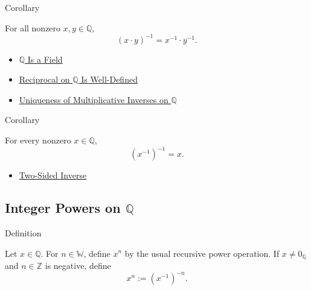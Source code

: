 \begin{corollarybox}{Corollary}
\begin{corollary}
\label{cor:inverse-of-product-on-q}
For all nonzero $x,y\in\mathbb{Q}$,
\[
(x\cdot y)^{-1}=x^{-1}\cdot y^{-1}.
\]
\end{corollary}
\end{corollarybox}

\begin{dependencies}
\begin{itemize}
  \item \hyperref[thm:q-is-a-field]{$\mathbb{Q}$ Is a Field}
  \item \hyperref[thm:reciprocal-on-q-well-defined]{Reciprocal on $\mathbb{Q}$ Is Well-Defined}
  \item \hyperref[cor:uniqueness-multiplicative-inverse-on-q]{Uniqueness of Multiplicative Inverses on $\mathbb{Q}$}
\end{itemize}
\end{dependencies}

\begin{corollarybox}{Corollary}
\begin{corollary}
\label{cor:inverse-of-inverse-on-q}
For every nonzero $x\in\mathbb{Q}$,
\[
(x^{-1})^{-1}=x.
\]
\end{corollary}
\end{corollarybox}

\begin{dependencies}
\begin{itemize}
  \item \hyperref[def:two-sided-inverse]{Two-Sided Inverse}
\end{itemize}
\end{dependencies}

\subsection*{\texorpdfstring{Integer Powers on $\mathbb{Q}$}{Integer Powers on Q}}

\begin{definitionbox}{Definition}
\begin{definition}
\label{def:integer-power-on-q}
Let $x\in\mathbb{Q}$. For $n\in\mathbb{W}$, define $x^n$ by the usual
recursive power operation. If $x\ne 0_{\mathbb{Q}}$ and $n\in\mathbb{Z}$ is
negative, define
\[
x^n:=(x^{-1})^{-n}.
\]
\end{definition}
\end{definitionbox}

